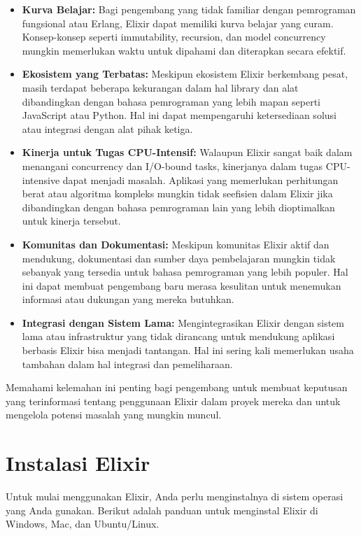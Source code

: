 \begin{itemize}
	\item \textbf{Kurva Belajar:} Bagi pengembang yang tidak familiar dengan pemrograman fungsional atau Erlang, Elixir dapat memiliki kurva belajar yang curam. Konsep-konsep seperti immutability, recursion, dan model concurrency mungkin memerlukan waktu untuk dipahami dan diterapkan secara efektif.
	
	\item \textbf{Ekosistem yang Terbatas:} Meskipun ekosistem Elixir berkembang pesat, masih terdapat beberapa kekurangan dalam hal library dan alat dibandingkan dengan bahasa pemrograman yang lebih mapan seperti JavaScript atau Python. Hal ini dapat mempengaruhi ketersediaan solusi atau integrasi dengan alat pihak ketiga.
	
	\item \textbf{Kinerja untuk Tugas CPU-Intensif:} Walaupun Elixir sangat baik dalam menangani concurrency dan I/O-bound tasks, kinerjanya dalam tugas CPU-intensive dapat menjadi masalah. Aplikasi yang memerlukan perhitungan berat atau algoritma kompleks mungkin tidak seefisien dalam Elixir jika dibandingkan dengan bahasa pemrograman lain yang lebih dioptimalkan untuk kinerja tersebut.
	
	\item \textbf{Komunitas dan Dokumentasi:} Meskipun komunitas Elixir aktif dan mendukung, dokumentasi dan sumber daya pembelajaran mungkin tidak sebanyak yang tersedia untuk bahasa pemrograman yang lebih populer. Hal ini dapat membuat pengembang baru merasa kesulitan untuk menemukan informasi atau dukungan yang mereka butuhkan.
	
	\item \textbf{Integrasi dengan Sistem Lama:} Mengintegrasikan Elixir dengan sistem lama atau infrastruktur yang tidak dirancang untuk mendukung aplikasi berbasis Elixir bisa menjadi tantangan. Hal ini sering kali memerlukan usaha tambahan dalam hal integrasi dan pemeliharaan.
\end{itemize}

Memahami kelemahan ini penting bagi pengembang untuk membuat keputusan yang terinformasi tentang penggunaan Elixir dalam proyek mereka dan untuk mengelola potensi masalah yang mungkin muncul.

\section{Instalasi Elixir}

Untuk mulai menggunakan Elixir, Anda perlu menginstalnya di sistem operasi yang Anda gunakan. Berikut adalah panduan untuk menginstal Elixir di Windows, Mac, dan Ubuntu/Linux.

